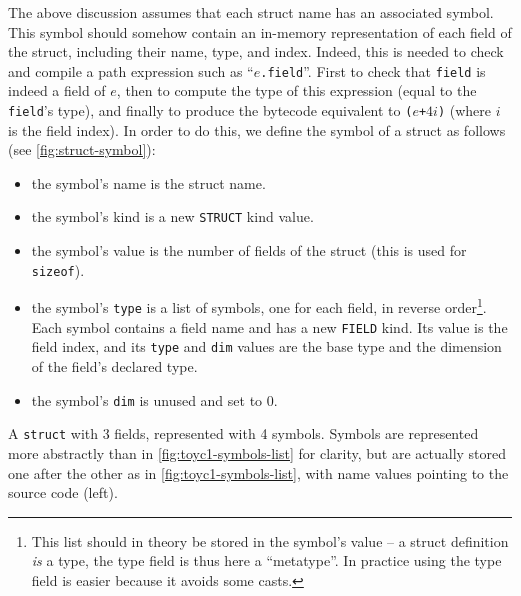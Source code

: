 The above discussion assumes that each struct name has an associated symbol.
This symbol should somehow contain an in-memory representation of each field of
the struct, including their name, type, and index. Indeed, this is needed to
check and compile a path expression such as ``{\tt $e$.field}''. First to check
that {\tt field} is indeed a field of $e$, then to compute the type of this
expression (equal to the {\tt field}'s type), and finally to produce the
bytecode equivalent to {\tt *($e$+$4i$)} (where $i$ is the field index). In
order to do this, we define the symbol of a struct as follows (see
\cref{fig:struct-symbol}):
\begin{itemize}
  \item the symbol's name is the struct name.

  \item the symbol's kind is a new {\tt STRUCT} kind value.

  \item the symbol's value is the number of fields of the struct (this is used
  for {\tt sizeof}).

  \item the symbol's {\tt type} is a list of symbols, one for each field, in
  reverse order\footnote{This list should in theory be stored in the symbol's
  value -- a struct definition {\em is} a type, the type field is thus here a
  ``metatype''. In practice using the type field is easier because it avoids
  some casts.}. Each symbol contains a field name and has a new {\tt FIELD}
  kind. Its value is the field index, and its {\tt type} and {\tt dim} values
  are the base type and the dimension of the field's declared type.

  \item the symbol's {\tt dim} is unused and set to 0.
\end{itemize}

\begin{Figure}
  

  \caption{A {\tt struct} with 3 fields, represented with 4 symbols. Symbols
  are represented more abstractly than in \cref{fig:toyc1-symbols-list} for
  clarity, but are actually stored one after the other as in
  \cref{fig:toyc1-symbols-list}, with name values pointing to the source code
  (left).}\label{fig:struct-symbol}
\end{Figure}


